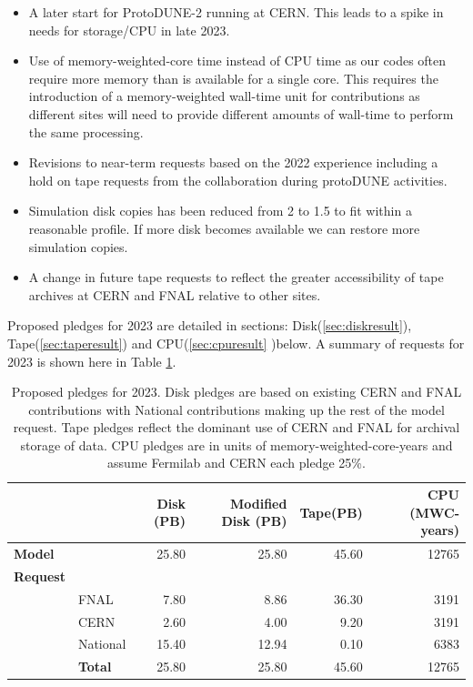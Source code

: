\documentclass[12pt]{article}
\begin{document}
\begin{itemize}
\item A later start for ProtoDUNE-2 running at CERN. This leads to a spike in needs for storage/CPU in late 2023. 
\item Use of memory-weighted-core time instead of CPU time as our codes often require more memory than is available for a single core.   This requires the introduction of a memory-weighted wall-time unit for contributions  as different sites will  need to provide different amounts of wall-time to perform the same processing. 
\item Revisions to near-term requests based on the 2022 experience including a hold on tape requests from the collaboration during protoDUNE activities. 
\item Simulation disk copies has been reduced from 2 to 1.5 to fit within a reasonable profile.  If more disk becomes available we can restore more simulation copies.  
\item A change in future tape requests to reflect the greater accessibility of tape archives at CERN and FNAL relative to other sites. 
\end{itemize}

Proposed pledges for 2023 are detailed  in sections: Disk(\ref{sec:diskresult}), Tape(\ref{sec:taperesult}) and CPU(\ref{sec:cpuresult} )below.   A summary of requests for 2023 is shown here in Table \ref{tab:summary2023}.

\begin{table}[ht]
\begin{centering}

\begin{tabular}{|ll|rr|r|r|}
\hline
 	&&	Disk (PB)	&	Modified Disk (PB)	&	Tape(PB)	&	CPU (MWC-years)	\\
	\hline
{\bf Model}	&&	25.80	&	25.80	&	45.60	&	12765	\\
\hline
{\bf Request}	&&		&		&		&		\\
&FNAL	&	7.80	&	8.86	&	36.30	&	3191	\\
&CERN	&	2.60	&	4.00	&	9.20	&	3191	\\
&National	&	15.40	&	12.94	&	0.10	&	6383	\\
\hline
&{\bf Total}	&	25.80	&	25.80	&	45.60	&	12765	\\
\hline
\end{tabular}

\caption{Proposed pledges for 2023.  Disk pledges are based on existing CERN and FNAL contributions with National contributions making up the rest of the model request.  Tape pledges reflect the dominant use of CERN and FNAL for archival storage of data.  CPU pledges are in units of memory-weighted-core-years and assume Fermilab and CERN each pledge 25\%.   }
\end{centering}
\label{tab:summary2023}
\end{table}
\end{document}
